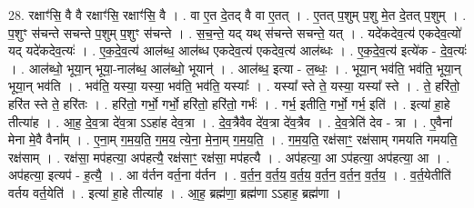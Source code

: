 \documentclass[17pt]{extarticle}
\begin{document}
28. रक्षाꣳ॑सि॒ वै वै रक्षाꣳ॑सि॒ रक्षाꣳ॑सि॒ वै । . वा ए॒त दे॒तद् वै वा ए॒तत् । . ए॒तत् प॒शुम् प॒शु मे॒त दे॒तत् प॒शुम् । . प॒शुꣳ स॑चन्ते सचन्ते प॒शुम् प॒शुꣳ स॑चन्ते । . स॒च॒न्ते॒ यद् यथ् स॑चन्ते सचन्ते॒ यत् । . यदे॑कदेव॒त्य॑ एकदेव॒त्यो॑ यद् यदे॑कदेव॒त्यः॑ । . ए॒क॒दे॒व॒त्य॑ आल॑ब्ध॒ आल॑ब्ध एकदेव॒त्य॑ एकदेव॒त्य॑ आल॑ब्धः । . ए॒क॒दे॒व॒त्य॑ इत्ये॑क - दे॒व॒त्यः॑ । . आल॑ब्धो॒ भूया॒न् भूया॒-नाल॑ब्ध॒ आल॑ब्धो॒ भूयान्॑ । . आल॑ब्ध॒ इत्या - ल॒ब्धः॒ । . भूया॒न् भव॑ति॒ भव॑ति॒ भूया॒न् भूया॒न् भव॑ति । . भव॑ति॒ यस्या॒ यस्या॒ भव॑ति॒ भव॑ति॒ यस्याः᳚ । . यस्या᳚ स्ते ते॒ यस्या॒ यस्या᳚ स्ते । . ते॒ हरि॑तो॒ हरि॑त स्ते ते॒ हरि॑तः । . हरि॑तो॒ गर्भो॒ गर्भो॒ हरि॑तो॒ हरि॑तो॒ गर्भः॑ । . गर्भ॒ इतीति॒ गर्भो॒ गर्भ॒ इति॑ । . इत्या॑ हा॒हे तीत्या॑ह । . आ॒ह॒ दे॒व॒त्रा दे॑व॒त्रा ऽऽहा॑ह देव॒त्रा । . दे॒व॒त्रैवैव दे॑व॒त्रा दे॑व॒त्रैव । . दे॒व॒त्रेति॑ देव - त्रा । . ए॒वैना॑ मेना मे॒वै वैना᳚म् । . ए॒ना॒म् ग॒म॒य॒ति॒ ग॒म॒य॒ त्ये॒ना॒ मे॒ना॒म् ग॒म॒य॒ति॒ । . ग॒म॒य॒ति॒ रक्ष॑साꣳ॒॒ रक्ष॑साम् गमयति गमयति॒ रक्ष॑साम् । . रक्ष॑सा॒ मप॑हत्या॒ अप॑हत्यै॒ रक्ष॑साꣳ॒॒ रक्ष॑सा॒ मप॑हत्यै । . अप॑हत्या॒ आ ऽप॑हत्या॒ अप॑हत्या॒ आ । . अप॑हत्या॒ इत्यप॑ - ह॒त्यै॒ । . आ व॑र्तन वर्त॒ना व॑र्तन । . व॒र्त॒न॒ व॒र्त॒य॒ व॒र्त॒य॒ व॒र्त॒न॒ व॒र्त॒न॒ व॒र्त॒य॒ । . व॒र्त॒येतीति॑ वर्तय वर्त॒येति॑ । . इत्या॑ हा॒हे तीत्या॑ह । . आ॒ह॒ ब्रह्म॑णा॒ ब्रह्म॑णा ऽऽहाह॒ ब्रह्म॑णा । \newline
\end{document}
